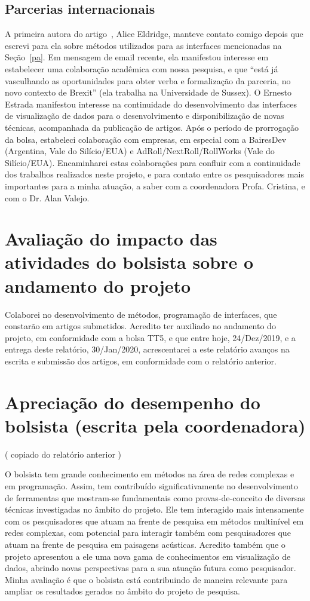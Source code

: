 \documentclass[a4paper, 11pt]{article}
\begin{document}
\subsection{Parcerias internacionais}
A primeira autora do artigo~\cite{eld}, Alice Eldridge,
manteve contato comigo depois que escrevi para ela sobre
métodos utilizados para as interfaces mencionadas na Seção~\ref{pa}.
Em mensagem de email recente, ela manifestou interesse em
estabelecer uma colaboração acadêmica com nossa pesquisa, e que ``está já
vasculhando as oportunidades para obter verba e formalização da parceria,
no novo contexto de Brexit'' (ela trabalha na Universidade de Sussex).
O Ernesto Estrada manifestou interesse na continuidade do desenvolvimento
das interfaces de visualização de dados para o desenvolvimento e disponibilização
de novas técnicas, acompanhada da publicação de artigos.
Após o período de prorrogação da bolsa, estabeleci colaboração
com empresas, em especial com a BairesDev (Argentina, Vale do Silício/EUA) e
AdRoll/NextRoll/RollWorks (Vale do Silício/EUA). 
Encaminharei estas colaborações para confluir com a continuidade dos
trabalhos realizados neste projeto, e para contato entre os pesquisadores
mais importantes para a minha atuação, a saber com a coordenadora Profa. Cristina,
e com o Dr. Alan Valejo.

\section{Avaliação do impacto das atividades do bolsista sobre o andamento do projeto}
Colaborei no desenvolvimento de métodos, programação de interfaces,
que constarão em artigos submetidos.
Acredito ter auxiliado no andamento do projeto, em conformidade com a bolsa TT5,
e que entre hoje, 24/Dez/2019, e a entrega deste relatório, 30/Jan/2020, acrescentarei
a este relatório avanços na escrita e submissão dos artigos, em conformidade
com o relatório anterior.


\section{Apreciação do desempenho do bolsista (escrita pela coordenadora)}
( copiado do relatório anterior )

O bolsista tem grande conhecimento em métodos na área de redes complexas e em
programação. Assim, tem contribuído significativamente no desenvolvimento de
ferramentas que mostram-se fundamentais como provas-de-conceito de diversas
técnicas investigadas no âmbito do projeto. Ele tem interagido mais
intensamente com os pesquisadores que atuam na frente de pesquisa em métodos
multinível em redes complexas, com potencial para interagir também com
pesquisadores que atuam na frente de pesquisa em paisagens acústicas. Acredito
também que o projeto apresentou a ele uma nova gama de conhecimentos em
visualização de dados, abrindo novas perspectivas para a sua atuação futura
como pesquisador. Minha avaliação é que o bolsista está contribuindo de maneira
relevante para ampliar os resultados gerados no âmbito do projeto de pesquisa.



\end{document}
